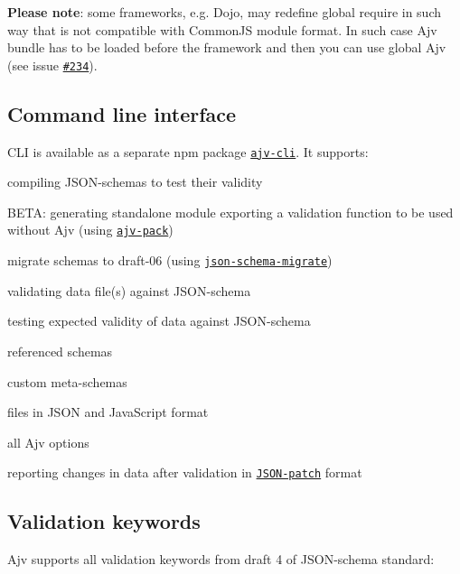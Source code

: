 \href{https://saucelabs.com/u/epoberezkin}{\tt }

{\bfseries Please note}\+: some frameworks, e.\+g. Dojo, may redefine global require in such way that is not compatible with Common\+JS module format. In such case Ajv bundle has to be loaded before the framework and then you can use global Ajv (see issue \href{https://github.com/epoberezkin/ajv/issues/234}{\tt \#234}).

\subsection*{Command line interface}

C\+LI is available as a separate npm package \href{https://github.com/jessedc/ajv-cli}{\tt ajv-\/cli}. It supports\+:


\begin{DoxyItemize}
\item compiling J\+S\+O\+N-\/schemas to test their validity
\item B\+E\+TA\+: generating standalone module exporting a validation function to be used without Ajv (using \href{https://github.com/epoberezkin/ajv-pack}{\tt ajv-\/pack})
\item migrate schemas to draft-\/06 (using \href{https://github.com/epoberezkin/json-schema-migrate}{\tt json-\/schema-\/migrate})
\item validating data file(s) against J\+S\+O\+N-\/schema
\item testing expected validity of data against J\+S\+O\+N-\/schema
\item referenced schemas
\item custom meta-\/schemas
\item files in J\+S\+ON and Java\+Script format
\item all Ajv options
\item reporting changes in data after validation in \href{https://tools.ietf.org/html/rfc6902}{\tt J\+S\+O\+N-\/patch} format
\end{DoxyItemize}

\subsection*{Validation keywords}

Ajv supports all validation keywords from draft 4 of J\+S\+O\+N-\/schema standard\+:


